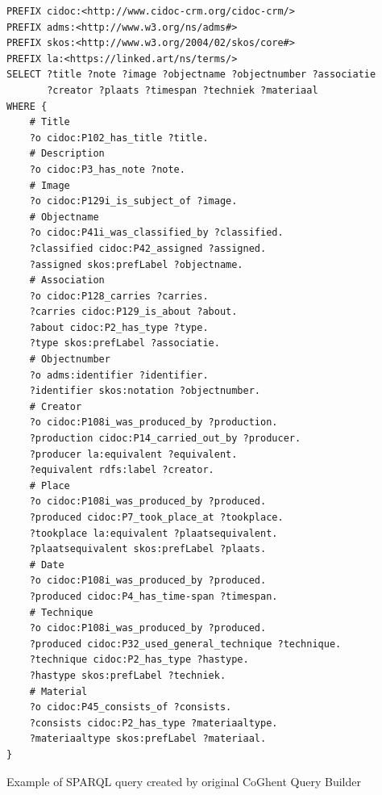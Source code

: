 \begin{listing}[htbp]
    \begin{verbatim}
PREFIX cidoc:<http://www.cidoc-crm.org/cidoc-crm/>
PREFIX adms:<http://www.w3.org/ns/adms#>
PREFIX skos:<http://www.w3.org/2004/02/skos/core#>
PREFIX la:<https://linked.art/ns/terms/>
SELECT ?title ?note ?image ?objectname ?objectnumber ?associatie
       ?creator ?plaats ?timespan ?techniek ?materiaal
WHERE {
    # Title
    ?o cidoc:P102_has_title ?title.
    # Description
    ?o cidoc:P3_has_note ?note.
    # Image
    ?o cidoc:P129i_is_subject_of ?image.
    # Objectname
    ?o cidoc:P41i_was_classified_by ?classified.
    ?classified cidoc:P42_assigned ?assigned.
    ?assigned skos:prefLabel ?objectname.
    # Association
    ?o cidoc:P128_carries ?carries.
    ?carries cidoc:P129_is_about ?about.
    ?about cidoc:P2_has_type ?type.
    ?type skos:prefLabel ?associatie.
    # Objectnumber
    ?o adms:identifier ?identifier.
    ?identifier skos:notation ?objectnumber.
    # Creator
    ?o cidoc:P108i_was_produced_by ?production.
    ?production cidoc:P14_carried_out_by ?producer.
    ?producer la:equivalent ?equivalent.
    ?equivalent rdfs:label ?creator.
    # Place
    ?o cidoc:P108i_was_produced_by ?produced.
    ?produced cidoc:P7_took_place_at ?tookplace.
    ?tookplace la:equivalent ?plaatsequivalent.
    ?plaatsequivalent skos:prefLabel ?plaats.
    # Date
    ?o cidoc:P108i_was_produced_by ?produced.
    ?produced cidoc:P4_has_time-span ?timespan.
    # Technique
    ?o cidoc:P108i_was_produced_by ?produced.
    ?produced cidoc:P32_used_general_technique ?technique.
    ?technique cidoc:P2_has_type ?hastype.
    ?hastype skos:prefLabel ?techniek.
    # Material
    ?o cidoc:P45_consists_of ?consists.
    ?consists cidoc:P2_has_type ?materiaaltype.
    ?materiaaltype skos:prefLabel ?materiaal.
}
    \end{verbatim}
    \caption{Example of SPARQL query created by original CoGhent Query Builder}
    \label{lst:coghent_builder_original}
\end{listing}